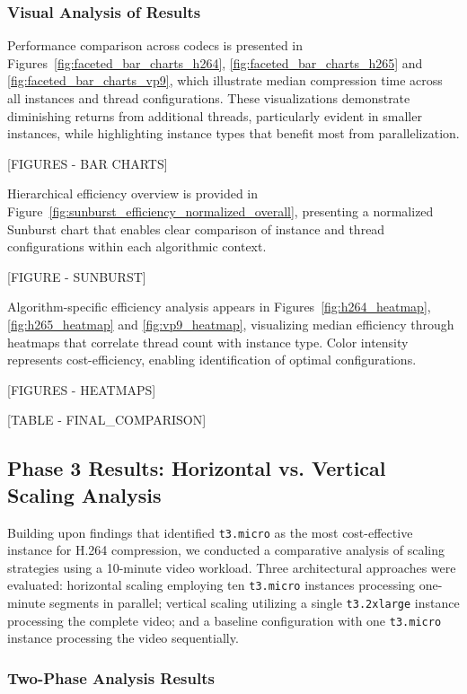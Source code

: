 \documentclass[conference]{IEEEtran}
\begin{document}
	\subsubsection{Visual Analysis of Results}
	
	Performance comparison across codecs is presented in Figures~\ref{fig:faceted_bar_charts_h264}, \ref{fig:faceted_bar_charts_h265} and \ref{fig:faceted_bar_charts_vp9}, which illustrate median compression time across all instances and thread configurations. These visualizations demonstrate diminishing returns from additional threads, particularly evident in smaller instances, while highlighting instance types that benefit most from parallelization.
	
	[FIGURES - BAR CHARTS]
	
	Hierarchical efficiency overview is provided in Figure~\ref{fig:sunburst_efficiency_normalized_overall}, presenting a normalized Sunburst chart that enables clear comparison of instance and thread configurations within each algorithmic context.
	
	[FIGURE - SUNBURST]
	
	Algorithm-specific efficiency analysis appears in Figures~\ref{fig:h264_heatmap}, \ref{fig:h265_heatmap} and \ref{fig:vp9_heatmap}, visualizing median efficiency through heatmaps that correlate thread count with instance type. Color intensity represents cost-efficiency, enabling identification of optimal configurations.
	
	[FIGURES - HEATMAPS]
	
	[TABLE - FINAL_COMPARISON]
	
	\subsection{Phase 3 Results: Horizontal vs. Vertical Scaling Analysis}
	\label{results-phase3}
	
	Building upon findings that identified \texttt{t3.micro} as the most cost-effective instance for H.264 compression, we conducted a comparative analysis of scaling strategies using a 10-minute video workload. Three architectural approaches were evaluated: horizontal scaling employing ten \texttt{t3.micro} instances processing one-minute segments in parallel; vertical scaling utilizing a single \texttt{t3.2xlarge} instance processing the complete video; and a baseline configuration with one \texttt{t3.micro} instance processing the video sequentially.
	
	\subsubsection{Two-Phase Analysis Results}
	
\end{document}
